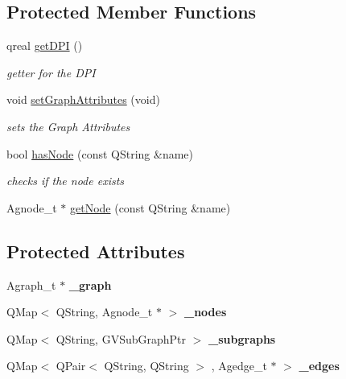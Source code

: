 \subsection*{\-Protected \-Member \-Functions}
\begin{DoxyCompactItemize}
\item 
qreal \hyperlink{class_g_v_sub_graph_a0405ca939a02f54ccdf044a5a6f4ff6b}{get\-D\-P\-I} ()
\begin{DoxyCompactList}\small\item\em getter for the \-D\-P\-I \end{DoxyCompactList}\item 
\hypertarget{class_g_v_sub_graph_a6f94775bfde0ef47c59df8a7e6510aaf}{void \hyperlink{class_g_v_sub_graph_a6f94775bfde0ef47c59df8a7e6510aaf}{set\-Graph\-Attributes} (void)}\label{class_g_v_sub_graph_a6f94775bfde0ef47c59df8a7e6510aaf}

\begin{DoxyCompactList}\small\item\em sets the \-Graph \-Attributes \end{DoxyCompactList}\item 
bool \hyperlink{class_g_v_sub_graph_af55511f05fe4d65e122cc77c2d02a706}{has\-Node} (const \-Q\-String \&name)
\begin{DoxyCompactList}\small\item\em checks if the node exists \end{DoxyCompactList}\item 
\-Agnode\-\_\-t $\ast$ \hyperlink{class_g_v_sub_graph_aaa1df9ed6bbd2ea697646e8bbfb571da}{get\-Node} (const \-Q\-String \&name)
\end{DoxyCompactItemize}
\subsection*{\-Protected \-Attributes}
\begin{DoxyCompactItemize}
\item 
\hypertarget{class_g_v_sub_graph_ae9ba380851ecbc611bbe9cd2980ba152}{\-Agraph\-\_\-t $\ast$ {\bfseries \-\_\-graph}}\label{class_g_v_sub_graph_ae9ba380851ecbc611bbe9cd2980ba152}

\item 
\hypertarget{class_g_v_sub_graph_ab994dac998f44c0566567d9cf28c5aae}{\-Q\-Map$<$ \-Q\-String, \-Agnode\-\_\-t $\ast$ $>$ {\bfseries \-\_\-nodes}}\label{class_g_v_sub_graph_ab994dac998f44c0566567d9cf28c5aae}

\item 
\hypertarget{class_g_v_sub_graph_a4bfd077344f6c2c530bb614b347ee7e0}{\-Q\-Map$<$ \-Q\-String, \-G\-V\-Sub\-Graph\-Ptr $>$ {\bfseries \-\_\-subgraphs}}\label{class_g_v_sub_graph_a4bfd077344f6c2c530bb614b347ee7e0}

\item 
\hypertarget{class_g_v_sub_graph_af3e72648f3a35641ca27b948791e32ca}{\-Q\-Map$<$ \-Q\-Pair$<$ \-Q\-String, \-Q\-String $>$\*
, \-Agedge\-\_\-t $\ast$ $>$ {\bfseries \-\_\-edges}}\label{class_g_v_sub_graph_af3e72648f3a35641ca27b948791e32ca}

\end{DoxyCompactItemize}


